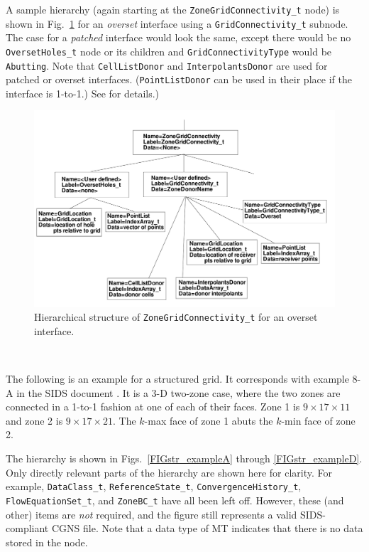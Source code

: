 \documentclass[12pt]{article}
\begin{document}
A sample hierarchy (again starting at the {\tt ZoneGridConnectivity\_t} node)
is shown in Fig.~\ref{FIGconnectivityU} 
for an {\it overset} interface using a {\tt GridConnectivity\_t} 
subnode.  The case for a {\it patched} interface would look the
same, except there would be no {\tt OversetHoles\_t} node
or its children and {\tt GridConnectivityType} would be {\tt Abutting}.  Note that {\tt CellListDonor} 
and {\tt InterpolantsDonor} are used for
patched or overset interfaces.  ({\tt PointListDonor} can be 
used in their place if the interface is 1-to-1.)
See \cite{ALLMARAS} \cite{CGNS2} for details.)

\begin{figure}[hpbt]
\centerline{{\includegraphics[width=150mm]{figures/connectivityU}}}
\caption{Hierarchical structure of {\tt ZoneGridConnectivity\_t} for an
overset interface.}
\label{FIGconnectivityU}
\end{figure}
%

~
\newpage

The following is an example for a structured grid.
It corresponds with example 8-A in the SIDS document \cite{ALLMARAS}.
It is a 3-D two-zone case, where the two zones are connected in
a 1-to-1 fashion at one of each of their faces.  Zone 1 is
$9 \times 17 \times 11$ and zone 2 is $9 \times 17 \times 21$.
The $k$-max face of zone 1 abuts the $k$-min face of zone 2.

The hierarchy
is shown in Figs.~\ref{FIGstr_exampleA} through \ref{FIGstr_exampleD}.  
Only directly relevant parts of the
hierarchy are shown here for clarity.  For example, {\tt DataClass\_t},
{\tt ReferenceState\_t}, {\tt ConvergenceHistory\_t}, 
{\tt FlowEquationSet\_t}, and {\tt ZoneBC\_t} 
have all been left off.  However, these (and other) items are
{\it not} required, and the figure still represents a valid
SIDS-compliant CGNS file.
Note that a data type of MT
indicates that there is no data stored in the node.
\end{document}
